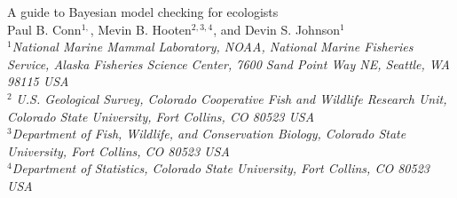 \documentclass[12pt,english]{article}
\begin{document}
\begin{spacing}{1.9}


\begin{center}
  A guide to Bayesian model checking for ecologists
  \bigskip\\
  \normalsize {\sc Paul B. Conn$^{1,}$\footnotemark[5], Mevin
    B. Hooten$^{2,3,4}$, and
    Devin S. Johnson$^1$ }\smallskip\\
  $^1${\em National Marine Mammal Laboratory, NOAA, National Marine
    Fisheries Service, Alaska Fisheries Science Center, 7600 Sand
    Point Way NE, Seattle, WA 98115 USA }\\ \medskip $^2${\em
    U.S. Geological Survey, Colorado Cooperative Fish and Wildlife
    Research Unit, Colorado State University, Fort Collins, CO 80523
    USA }\\ \medskip $^3${\em Department of Fish, Wildlife, and
    Conservation Biology, Colorado State University, Fort Collins, CO
    80523 USA }\\ \medskip $^4${\em Department of Statistics, Colorado
    State University, Fort Collins, CO 80523 USA }\\ \medskip
\end{center}


\raggedright \setlength{\parindent}{0.3in}
{}

\linenumbers


\end{spacing}
\end{document}
